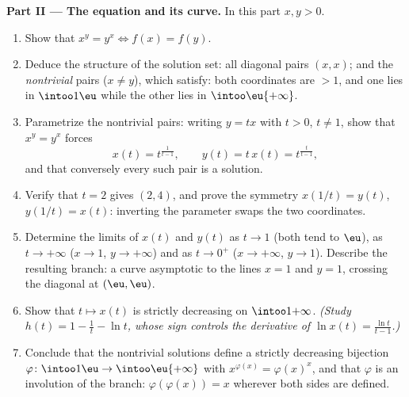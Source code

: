 \begin{problem}
\medskip
\noindent\textbf{Part II --- The equation and its curve.} In this
part $x, y > 0$.
\begin{enumerate}[resume]
  \item Show that $x^y = y^x \iff f(x) = f(y)$.
  \item Deduce the structure of the solution set: all diagonal
        pairs $(x, x)$; and the \emph{nontrivial} pairs ($x \neq
        y$), which satisfy: both coordinates are $> 1$, and one
        lies in $\intoo1\eu$ while the other lies in
        $\intoo\eu{+\infty}$.
  \item Parametrize the nontrivial pairs: writing $y = tx$ with $t
        > 0$, $t \neq 1$, show that $x^y = y^x$ forces
        \[
        x(t) = t^{\frac1{t-1}},
        \qquad
        y(t) = t\,x(t) = t^{\frac{t}{t-1}},
        \]
        and that conversely every such pair is a solution.
  \item Verify that $t = 2$ gives $(2, 4)$, and prove the symmetry
        $x(1/t) = y(t)$, $y(1/t) = x(t)$: inverting the parameter
        swaps the two coordinates.
  \item Determine the limits of $x(t)$ and $y(t)$ as $t \to 1$
        (both tend to $\eu$), as $t \to +\infty$ ($x \to 1$, $y
        \to +\infty$) and as $t \to 0^+$ ($x \to +\infty$, $y \to
        1$). Describe the resulting branch: a curve asymptotic to
        the lines $x = 1$ and $y = 1$, crossing the diagonal at
        $(\eu, \eu)$.
  \item Show that $t \mapsto x(t)$ is strictly decreasing on
        $\intoo1{+\infty}$. \emph{(Study $h(t) = 1 - \frac1t - \ln
        t$, whose sign controls the derivative of $\ln x(t) =
        \frac{\ln t}{t - 1}$.)}
  \item Conclude that the nontrivial solutions define a strictly
        decreasing bijection $\varphi \colon \intoo1\eu \to
        \intoo\eu{+\infty}$ with $x^{\varphi(x)} = \varphi(x)^x$,
        and that $\varphi$ is an involution of the branch:
        $\varphi(\varphi(x)) = x$ wherever both sides are defined.
\end{enumerate}


\end{problem}
